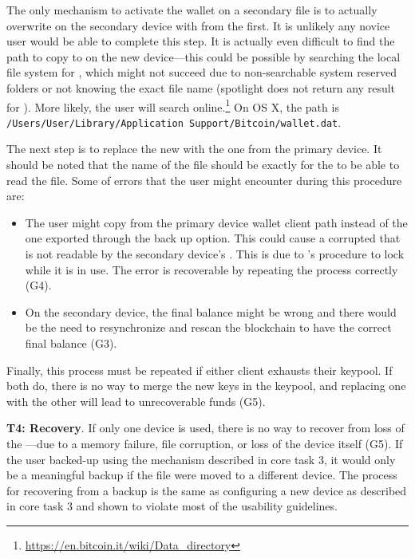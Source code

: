 The only mechanism to activate the wallet on a secondary file is to actually overwrite \walletfile on the secondary device with \walletfile from the first. It is unlikely any novice user would be able to complete this step. It is actually even difficult to find the path to copy \walletfile to on the new device---this could be possible by searching the local file system for \walletfile, which might not succeed due to non-searchable system reserved folders or not knowing the exact file name (spotlight does not return any result for \walletfile). More likely, the user will search online.\footnote{\url{https://en.bitcoin.it/wiki/Data_directory}} On OS X, the path is \texttt{/Users/User/Library/Application Support/Bitcoin/wallet.dat}.

The next step is to replace the new \walletfile with the one from the primary device. It should be noted that the name of the file should be exactly \walletfile for the \bitcoinclient to be able to read the file. Some of errors that the user might encounter during this procedure are:
\begin{itemize}
	\item The user might copy \walletfile from the primary device wallet client path instead of the one exported through the back up option. This could cause a corrupted \walletfile that is not readable by the secondary device's \bitcoinclient. This is due to \bitcoinclient's procedure to lock \walletfile while it is in use. The error is recoverable by repeating the process correctly (G4). 
	\item On the secondary device, the final balance might be wrong and there would be the need to resynchronize and rescan the blockchain to have the correct final balance (G3).
\end{itemize}

Finally, this process must be repeated if either client exhausts their keypool. If both do, there is no way to merge the new keys in the keypool, and replacing one \walletfile with the other will lead to unrecoverable funds (G5). 

\textbf{T4: Recovery}.
If only one device is used, there is no way to recover from loss of the \walletfile---\eg due to a memory failure, file corruption, or loss of the device itself (G5). If the user backed-up \walletfile using the mechanism described in core task 3, it would only be a meaningful backup if the file were moved to a different device. The process for recovering from a backup is the same as configuring a new device as described in core task 3 and shown to violate most of the usability guidelines.

